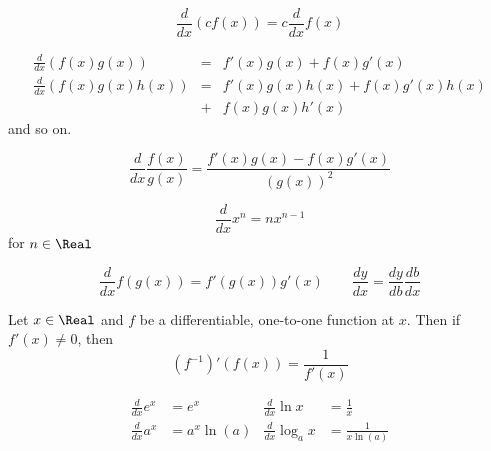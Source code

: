 \begin{theorem}
  \[
    \frac{d}{dx}(cf(x)) = c\frac{d}{dx}f(x)
  \]
\end{theorem}

\begin{theorem}
  \[\begin{aligned}
    \frac{d}{dx}(f(x)g(x)) &= &f'(x)g(x) + f(x)g'(x) \\
    \frac{d}{dx}(f(x)g(x)h(x)) &= &f'(x)g(x)h(x) + f(x)g'(x)h(x) \\
                               &+ &f(x)g(x)h'(x)
  \end{aligned}\]
  and so on.
\end{theorem}

\begin{theorem}
  \[
    \frac{d}{dx}\frac{f(x)}{g(x)} = \frac{f'(x)g(x) - f(x)g'(x)}{(g(x))^2}
  \]
\end{theorem}

\begin{theorem}
  \[
    \frac{d}{dx} x^n = nx^{n-1}
  \]
  for $n \in \Real$
\end{theorem}

\begin{theorem}
  \[
    \frac{d}{dx}f(g(x)) = f'(g(x))g'(x) \qquad \frac{dy}{dx} = \frac{dy}{db}\frac{db}{dx}
  \]
\end{theorem}

\begin{theorem}
  Let $x \in \Real$ and $f$ be a differentiable, one-to-one function at $x$. Then if $f'(x) \neq 0$, then
  \[
    (f^{-1})'(f(x)) = \frac{1}{f'(x)}
  \]
\end{theorem}

\begin{theorem}
  \[\begin{aligned}
    \frac{d}{dx} e^x &= e^x &
    \frac{d}{dx} \ln x &= \frac{1}{x} \\
    \frac{d}{dx} a^x &= a^x \ln(a)&
    \frac{d}{dx} \log_a x &= \frac{1}{x\ln(a)}
  \end{aligned}\]
\end{theorem}

